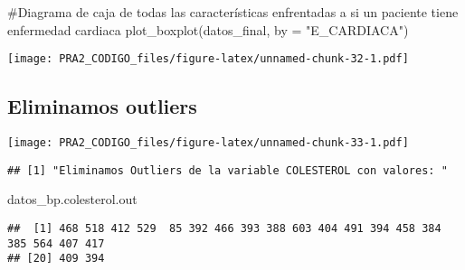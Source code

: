 \documentclass[
]{article}
\newenvironment{Shaded}{\begin{snugshade}}{\end{snugshade}}
\newcommand{\AttributeTok}[1]{\textcolor[rgb]{0.80,0.80,0.80}{#1}}
\newcommand{\CommentTok}[1]{\textcolor[rgb]{0.50,0.62,0.50}{#1}}
\newcommand{\FunctionTok}[1]{\textcolor[rgb]{0.94,0.94,0.56}{#1}}
\newcommand{\NormalTok}[1]{\textcolor[rgb]{0.80,0.80,0.80}{#1}}
\newcommand{\OtherTok}[1]{\textcolor[rgb]{0.94,0.94,0.56}{#1}}
\newcommand{\SpecialCharTok}[1]{\textcolor[rgb]{0.86,0.64,0.64}{#1}}
\newcommand{\StringTok}[1]{\textcolor[rgb]{0.80,0.58,0.58}{#1}}
\begin{document}
\begin{Shaded}
\begin{Highlighting}[]
\CommentTok{\#Diagrama de caja de todas las características enfrentadas a si un paciente tiene enfermedad cardiaca}
\FunctionTok{plot\_boxplot}\NormalTok{(datos\_final, }\AttributeTok{by =} \StringTok{"E\_CARDIACA"}\NormalTok{)}
\end{Highlighting}
\end{Shaded}

\texttt{[image: PRA2\_CODIGO\_files/figure-latex/unnamed-chunk-32-1.pdf]}

\hypertarget{eliminamos-outliers}{%
\subsection{Eliminamos outliers}\label{eliminamos-outliers}}

\begin{Shaded}
\end{Shaded}

\texttt{[image: PRA2\_CODIGO\_files/figure-latex/unnamed-chunk-33-1.pdf]}

\begin{Shaded}
\end{Shaded}

\begin{verbatim}
## [1] "Eliminamos Outliers de la variable COLESTEROL con valores: "
\end{verbatim}

\begin{Shaded}
\begin{Highlighting}[]
\NormalTok{datos\_bp.colesterol.out}
\end{Highlighting}
\end{Shaded}

\begin{verbatim}
##  [1] 468 518 412 529  85 392 466 393 388 603 404 491 394 458 384 385 564 407 417
## [20] 409 394
\end{verbatim}
\end{document}
